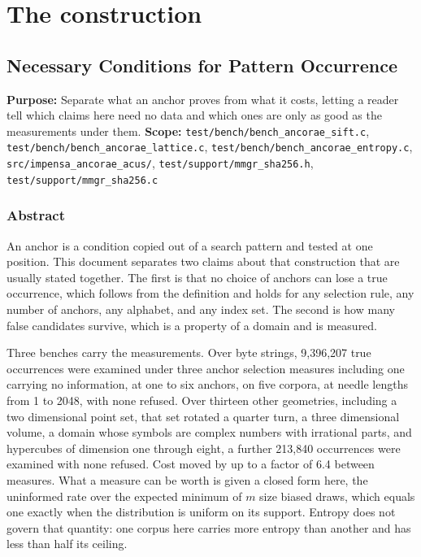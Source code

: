 \chapter{The construction}

\section{Necessary Conditions for Pattern Occurrence}

\textbf{Purpose:} Separate what an anchor proves from what it costs, letting a reader tell which claims here need no data and which ones are only as good as the measurements under them. \textbf{Scope:} \texttt{test/\allowbreak{}bench/\allowbreak{}bench\_\allowbreak{}ancorae\_\allowbreak{}sift.\allowbreak{}c}, \texttt{test/\allowbreak{}bench/\allowbreak{}bench\_\allowbreak{}ancorae\_\allowbreak{}lattice.\allowbreak{}c}, \texttt{test/\allowbreak{}bench/\allowbreak{}bench\_\allowbreak{}ancorae\_\allowbreak{}entropy.\allowbreak{}c}, \texttt{src/\allowbreak{}impensa\_\allowbreak{}ancorae\_\allowbreak{}acus/\allowbreak{}}, \texttt{test/\allowbreak{}support/\allowbreak{}mmgr\_\allowbreak{}sha256.\allowbreak{}h}, \texttt{test/\allowbreak{}support/\allowbreak{}mmgr\_\allowbreak{}sha256.\allowbreak{}c}

\subsection{Abstract}

An anchor is a condition copied out of a search pattern and tested at one position. This document separates two claims about that construction that are usually stated together. The first is that no choice of anchors can lose a true occurrence, which follows from the definition and holds for any selection rule, any number of anchors, any alphabet, and any index set. The second is how many false candidates survive, which is a property of a domain and is measured.

Three benches carry the measurements. Over byte strings, 9,396,207 true occurrences were examined under three anchor selection measures including one carrying no information, at one to six anchors, on five corpora, at needle lengths from 1 to 2048, with none refused. Over thirteen other geometries, including a two dimensional point set, that set rotated a quarter turn, a three dimensional volume, a domain whose symbols are complex numbers with irrational parts, and hypercubes of dimension one through eight, a further 213,840 occurrences were examined with none refused. Cost moved by up to a factor of 6.4 between measures. What a measure can be worth is given a closed form here, the uninformed rate over the expected minimum of \(m\) size biased draws, which equals one exactly when the distribution is uniform on its support. Entropy does not govern that quantity: one corpus here carries more entropy than another and has less than half its ceiling.

